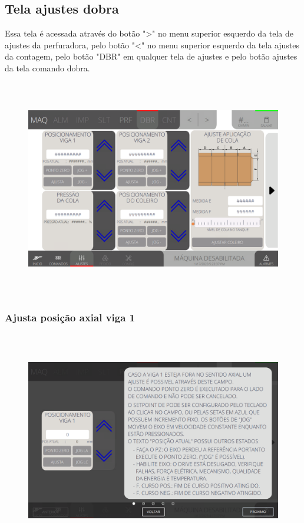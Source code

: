 \thispagestyle{fancy}
\vspace*{40 pt}
\subsection{Tela ajustes dobra}
Essa tela é acessada através do botão "\textgreater" no menu superior esquerdo da tela de ajustes da perfuradora, pelo botão "\textless{}" no menu superior esquerdo
da tela ajustes da contagem, pelo botão "DBR" em qualquer tela de ajustes e pelo botão ajustes da tela comando dobra.
\vspace*{\fill}
\begin{figure}[h]
  \centering
  \includegraphics[width=576px,height=360px]{src/imagesFlexo/07-fold/settings/e-Tela-Principal.png}
\end{figure}
\vspace*{\fill}

\newpage
\thispagestyle{fancy}
\vspace*{40 pt}
\subsubsection{\small{Ajusta posição axial viga 1}}
\vspace*{\fill}
\begin{figure}[h]
  \centering
  \includegraphics[width=576px,height=360px]{src/imagesFlexo/07-fold/settings/e-1.png}
\end{figure}
\vspace*{\fill}

